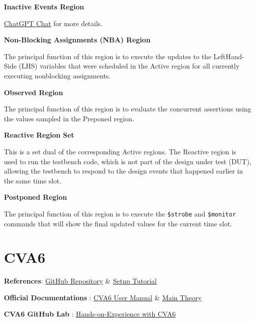 \documentclass[12pt, a4paper]{article}
\begin{document}
\vspace{0.5em}
\textbf{Inactive Events Region}

\href{https://chatgpt.com/s/t_6860e9b687108191af38e7e5cd53e6ea}{ChatGPT Chat} for more details.

\vspace{0.5em}
\textbf{Non-Blocking Assignments (NBA) Region}

The principal function of this region is to execute the updates to the LeftHand-Side (LHS) variables that were scheduled in the Active region for all currently executing nonblocking assignments.

\vspace{0.5em}
\textbf{Observed Region}

The principal function of this region is to evaluate the concurrent assertions using the values sampled in the Preponed region.

\vspace{0.5em}
\textbf{Reactive Region Set}

This is a set dual of the corresponding Active regions. The Reactive region is used to run the testbench code, which is not part of the design under test (DUT), allowing the testbench to respond to the design events that happened earlier in the same time slot.

\vspace{0.5em}
\textbf{Postponed Region}

The principal function of this region is to execute the \texttt{\$strobe} and \texttt{\$monitor} commands that will show the final updated values for the current time slot.

\section{CVA6}

\textbf{References}: \href{https://github.com/openhwgroup/cva6}{GitHub Repository} \&
\href{https://github.com/VedantPahariya/cva6/blob/master/tutorials/running_sim.md}{Setup Tutorial} 

\textbf{Official Documentations} : \href{https://docs.openhwgroup.org/projects/cva6-user-manual/03_cva6_design/index.html}{CVA6 User Manual} \&
\href{https://cva6.readthedocs.io/en/latest/03_cva6_design/intro.html}{Main Theory}

\textbf{CVA6 GitHub Lab} : \href{https://github.com/sifferman/labs-with-cva6}{Hands-on-Experience with CVA6}

\vspace{0.4em}
\end{document}
